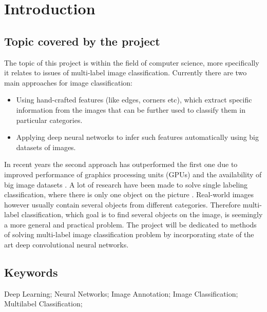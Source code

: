 \chapter{Introduction}
\label{chap:introduction}



\section{Topic covered by the project}
The topic of this project is within the field of computer science, more specifically it relates to issues of multi-label image classification. Currently there are two main approaches for image classification:
\begin{itemize}
    \item Using hand-crafted features (like edges, corners etc), which extract specific information from the images that can be further used to classify them in particular categories.
    \item Applying deep neural networks to infer such features automatically using big datasets of images.
\end{itemize}

In recent years the second approach has outperformed the first one due to improved performance of graphics processing units (GPUs) and the availability of big image datasets \cite{Krizhevsky2012ImageNetDNN, Russakovsky2015ImageNet}. %
A lot of research have been made to solve single labeling classification, where there is only one object on the picture \cite{Krizhevsky2012ImageNetDNN, Szegedy2015GoingDeeper, He2015DeepResidualRecognition, Zhang2016MultilevelResidualNetworks}. %
Real-world images however usually contain several objects from different categories. Therefore multi-label classification, which goal is to find several objects on the image, is seemingly a more general and practical problem. The project will be dedicated to methods of solving multi-label image classification problem by incorporating state of the art deep convolutional neural networks.


\section{Keywords}
Deep Learning; Neural Networks; Image Annotation; Image Classification; Multilabel Classification; 

